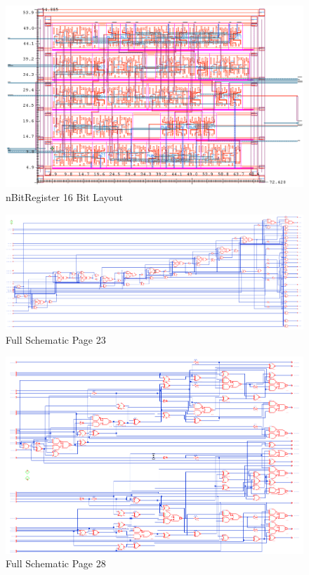 \documentclass[11pt]{article}
\begin{document}
	
	\begin{figure}[H] 
		\centering 
		\includegraphics[width=0.7\linewidth]{"Pictures/nBitRegister 16-Bit Layout"}
		\caption{nBitRegister 16 Bit Layout} 
		\label{fig:nBitRegister-16-Bit-Layout} 
	\end{figure}
	
	
	\begin{figure}[H] 
		\centering 
		\includegraphics[width=0.7\linewidth]{"Pictures/Full Schematic Page 23"}
		\caption{Full Schematic Page 23} 
		\label{fig:Full-Schematic-Page-23} 
	\end{figure}
	
	
	\begin{figure}[H] 
		\centering 
		\includegraphics[width=0.7\linewidth]{"Pictures/Full Schematic Page 28"}
		\caption{Full Schematic Page 28} 
		\label{fig:Full-Schematic-Page-28} 
	\end{figure}
	
\end{document}
